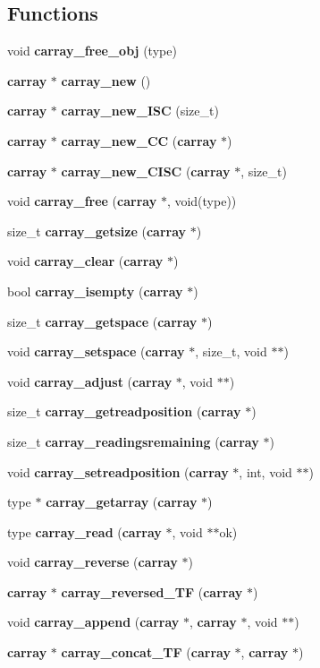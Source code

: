 \subsection*{Functions}
\begin{DoxyCompactItemize}
\item 
void {\bf carray\+\_\+free\+\_\+obj} (type)
\item 
{\bf carray} $\ast$ {\bf carray\+\_\+new} ()
\item 
{\bf carray} $\ast$ {\bf carray\+\_\+new\+\_\+\+I\+SC} (size\+\_\+t)
\item 
{\bf carray} $\ast$ {\bf carray\+\_\+new\+\_\+\+CC} ({\bf carray} $\ast$)
\item 
{\bf carray} $\ast$ {\bf carray\+\_\+new\+\_\+\+C\+I\+SC} ({\bf carray} $\ast$, size\+\_\+t)
\item 
void {\bfseries carray\+\_\+free} ({\bf carray} $\ast$, void(type))
\item 
size\+\_\+t {\bf carray\+\_\+getsize} ({\bf carray} $\ast$)
\item 
void {\bf carray\+\_\+clear} ({\bf carray} $\ast$)
\item 
bool {\bf carray\+\_\+isempty} ({\bf carray} $\ast$)
\item 
size\+\_\+t {\bf carray\+\_\+getspace} ({\bf carray} $\ast$)
\item 
void {\bf carray\+\_\+setspace} ({\bf carray} $\ast$, size\+\_\+t, void $\ast$$\ast$)
\item 
void {\bf carray\+\_\+adjust} ({\bf carray} $\ast$, void $\ast$$\ast$)
\item 
size\+\_\+t {\bf carray\+\_\+getreadposition} ({\bf carray} $\ast$)
\item 
size\+\_\+t {\bf carray\+\_\+readingsremaining} ({\bf carray} $\ast$)
\item 
void {\bf carray\+\_\+setreadposition} ({\bf carray} $\ast$, int, void $\ast$$\ast$)
\item 
type $\ast$ {\bf carray\+\_\+getarray} ({\bf carray} $\ast$)
\item 
type {\bf carray\+\_\+read} ({\bf carray} $\ast$, void $\ast$$\ast$ok)
\item 
void {\bf carray\+\_\+reverse} ({\bf carray} $\ast$)
\item 
{\bf carray} $\ast$ {\bf carray\+\_\+reversed\+\_\+\+TF} ({\bf carray} $\ast$)
\item 
void {\bf carray\+\_\+append} ({\bf carray} $\ast$, {\bf carray} $\ast$, void $\ast$$\ast$)
\item 
{\bf carray} $\ast$ {\bf carray\+\_\+concat\+\_\+\+TF} ({\bf carray} $\ast$, {\bf carray} $\ast$)
$$
\end{DoxyCompactItemize}

